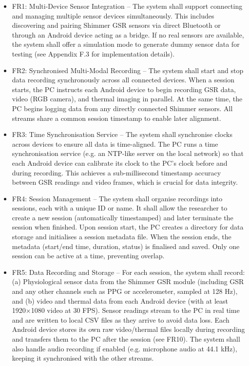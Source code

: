 \begin{itemize}
  \item FR1: Multi-Device Sensor Integration -- The system shall support connecting and managing multiple sensor devices simultaneously. This includes discovering and pairing Shimmer GSR sensors via direct Bluetooth or through an Android device acting as a bridge. If no real sensors are available, the system shall offer a simulation mode to generate dummy sensor data for testing (see Appendix F.3 for implementation details).

  \item FR2: Synchronised Multi-Modal Recording -- The system shall start and stop data recording synchronously across all connected devices. When a session starts, the PC instructs each Android device to begin recording GSR data, video (RGB camera), and thermal imaging in parallel. At the same time, the PC begins logging data from any directly connected Shimmer sensors. All streams share a common session timestamp to enable later alignment.

  \item FR3: Time Synchronisation Service -- The system shall synchronise clocks across devices to ensure all data is time-aligned. The PC runs a time synchronisation service (e.g. an NTP-like server on the local network) so that each Android device can calibrate its clock to the PC's clock before and during recording. This achieves a sub-millisecond timestamp accuracy between GSR readings and video frames, which is crucial for data integrity.

  \item FR4: Session Management -- The system shall organise recordings into sessions, each with a unique ID or name. It shall allow the researcher to create a new session (automatically timestamped) and later terminate the session when finished. Upon session start, the PC creates a directory for data storage and initialises a session metadata file. When the session ends, the metadata (start/end time, duration, status) is finalised and saved. Only one session can be active at a time, preventing overlap.

  \item FR5: Data Recording and Storage -- For each session, the system shall record: (a) Physiological sensor data from the Shimmer GSR module (including GSR and any other channels such as PPG or accelerometer, sampled at 128 Hz), and (b) video and thermal data from each Android device (with at least 1920×1080 video at 30 FPS). Sensor readings stream to the PC in real time and are written to local CSV files as they arrive to avoid data loss. Each Android device stores its own raw video/thermal files locally during recording and transfers them to the PC after the session (see FR10). The system shall also handle audio recording if enabled (e.g. microphone audio at 44.1 kHz), keeping it synchronised with the other streams.


\end{itemize}
